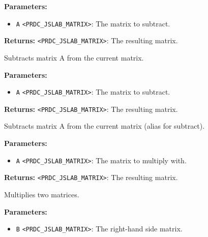 \documentclass[12pt,a4paper]{article}
\begin{document}
\noindent \textbf{Parameters:}
\begin{itemize}
  \item \texttt{A} \texttt{<PRDC\_JSLAB\_MATRIX>}: The matrix to subtract.
\end{itemize}

\noindent \textbf{Returns:} \texttt{<PRDC\_JSLAB\_MATRIX>}: The resulting matrix.

\noindent Subtracts matrix A from the current matrix.

\vspace{5mm}
\noindent {}


\noindent \textbf{Parameters:}
\begin{itemize}
  \item \texttt{A} \texttt{<PRDC\_JSLAB\_MATRIX>}: The matrix to subtract.
\end{itemize}

\noindent \textbf{Returns:} \texttt{<PRDC\_JSLAB\_MATRIX>}: The resulting matrix.

\noindent Subtracts matrix A from the current matrix (alias for subtract).

\vspace{5mm}
\noindent {}


\noindent \textbf{Parameters:}
\begin{itemize}
  \item \texttt{A} \texttt{<PRDC\_JSLAB\_MATRIX>}: The matrix to multiply with.
\end{itemize}

\noindent \textbf{Returns:} \texttt{<PRDC\_JSLAB\_MATRIX>}: The resulting matrix.

\noindent Multiplies two matrices.

\vspace{5mm}
\noindent {}


\noindent \textbf{Parameters:}
\begin{itemize}
  \item \texttt{B} \texttt{<PRDC\_JSLAB\_MATRIX>}: The right-hand side matrix.
\end{itemize}
\end{document}
